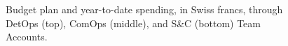 \begin{figure}[hbtp]
  \begin{center}
    \caption{Budget plan and year-to-date spending, in Swiss francs, through DetOps (top), ComOps (middle),
and S\&C (bottom) Team Accounts.}
    \label{fig:Team_Accounts}
  \end{center}
\end{figure}

\newpage

